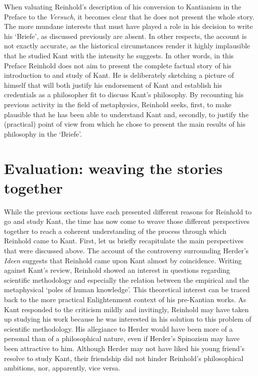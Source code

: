  When valuating Reinhold's description of his conversion to Kantianism in the Preface to the \textit{Versuch}, it becomes clear that he does not present the whole story. The more mundane interests that must have played a role in his decision to write his `Briefe', as discussed previously are absent. In other respects, the account is not exactly accurate, as the historical circumstances render it highly implausible that he studied Kant with the intensity he suggests. In other words, in this Preface Reinhold does not aim to present the complete factual story of his introduction to and study of Kant. He is deliberately sketching a picture of himself that will both justify his endorsement of Kant and establish his credentials as a philosopher fit to discuss Kant's philosophy. By recounting his previous activity in the field of metaphysics, Reinhold seeks, first, to make plausible that he has been able to understand Kant and, secondly, to justify the (practical) point of view from which he chose to present the main results of his philosophy in the `Briefe'.


\section{Evaluation: weaving the stories together}


While the previous sections have each presented different reasons for Reinhold to go and study Kant, the time has now come to weave those different perspectives together to reach a coherent understanding of the process through which Reinhold came to Kant. First, let us briefly recapitulate the main perspectives that were discussed above. The account of the controversy surrounding Herder's \textit{Ideen} suggests that Reinhold came upon Kant almost by coincidence. Writing against Kant's review, Reinhold showed an interest in questions regarding scientific methodology and especially the relation between the empirical and the metaphysical `poles of human knowledge'. This theoretical interest can be traced back to the more practical Enlightenment context of his pre{-}Kantian works. As Kant responded to the criticism mildly and invitingly, Reinhold may have taken up studying his work because he was interested in his solution to this problem of scientific methodology. His allegiance to Herder would have been more of a personal than of a philosophical nature, even if Herder's Spinozism may have been attractive to him. Although Herder may not have liked his young friend's resolve to study Kant, their friendship did not hinder Reinhold's philosophical ambitions, nor, apparently, vice versa. 

